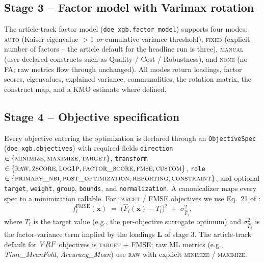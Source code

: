 \subsection{Stage 3 -- Factor model with Varimax rotation}
\label{sec:method-fa}
The article-track factor model
(\texttt{doe\_xgb.factor\_model}) supports four modes:
\textsc{auto} (Kaiser eigenvalue $>1$ \emph{or} cumulative variance
threshold), \textsc{fixed} (explicit number of factors -- the
article default for the headline run is three),
\textsc{manual} (user-declared constructs such as
Quality / Cost / Robustness), and \textsc{none}
(no FA; raw metrics flow through unchanged). All modes return
loadings, factor scores, eigenvalues, explained variance,
communalities, the rotation matrix, the construct map, and a KMO
estimate where defined.

\subsection{Stage 4 -- Objective specification}
\label{sec:method-objectives}
Every objective entering the optimization is declared through an
\texttt{ObjectiveSpec} (\texttt{doe\_xgb.objectives}) with required
fields \texttt{direction}
$\in \{\textsc{minimize},\textsc{maximize},\textsc{target}\}$,
\texttt{transform}
$\in \{\textsc{raw},\textsc{zscore},\textsc{log1p},\textsc{factor\_score},\textsc{fmse},\textsc{custom}\}$,
\texttt{role}
$\in \{\textsc{primary\_nbi},\textsc{post\_optimization},\textsc{reporting},\textsc{constraint}\}$,
and optional \texttt{target}, \texttt{weight}, \texttt{group},
\texttt{bounds}, and \texttt{normalization}.
A canonicalizer maps every spec to a minimization callable. For
\textsc{target} / FMSE objectives we use Eq.~21 of
\citet{pereira2025eaai}:
\begin{equation}
  f^{\text{FMSE}}_i(\bm x) \;=\; \bigl(\hat F_i(\bm x) - T_i\bigr)^{2}
                                  \;+\;\sigma^{2}_{\hat F_i},
  \label{eq:fmse}
\end{equation}
where $T_i$ is the target value (e.g., the per-objective surrogate
optimum) and $\sigma^{2}_{\hat F_i}$ is the factor-variance term
implied by the loadings $\bm L$ of stage 3. The article-track
default for $VRF$ objectives is \textsc{target} + FMSE; raw ML
metrics (e.g., \emph{Time\_MeanFold}, \emph{Accuracy\_Mean}) use
\textsc{raw} with explicit \textsc{minimize} / \textsc{maximize}.

